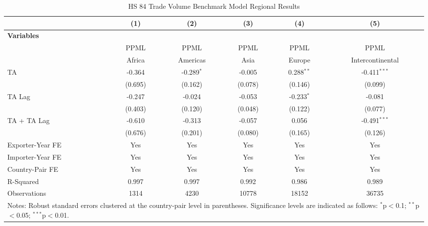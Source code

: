 \begin{table}[htbp]
    \centering
    \caption{HS 84 Trade Volume Benchmark Model Regional Results}
    \label{tab:84_trade_benchmark_region_analysis}
    \begin{adjustbox}{max width=\textwidth}
    \begin{tabular}{l@{\extracolsep{1pt}}ccccc}
    \hline
    & \multicolumn{1}{c}{(1)} & \multicolumn{1}{c}{(2)} & \multicolumn{1}{c}{(3)} & \multicolumn{1}{c}{(4)} & \multicolumn{1}{c}{(5)} \\
    \hline
    \textbf{Variables} &  &  &  &  &  \\
    \hline
     & PPML & PPML & PPML & PPML & PPML \\
     & Africa & Americas & Asia & Europe & Intercontinental \\
    \hline
    TA & -0.364 & -0.289$^{\ast}$ & -0.005 & 0.288$^{\ast\ast}$ & -0.411$^{\ast\ast\ast}$ \\
    & (0.695) & (0.162) & (0.078) & (0.146) & (0.099) \\

    TA Lag & -0.247 & -0.024 & -0.053 & -0.233$^{\ast}$ & -0.081 \\
    & (0.403) & (0.120) & (0.048) & (0.122) & (0.077) \\

    TA + TA Lag & -0.610 & -0.313 & -0.057 & 0.056 & -0.491$^{\ast\ast\ast}$ \\
    & (0.676) & (0.201) & (0.080) & (0.165) & (0.126) \\
    \hline
    Exporter-Year FE & Yes & Yes & Yes & Yes & Yes \\
    Importer-Year FE & Yes & Yes & Yes & Yes & Yes \\
    Country-Pair FE & Yes & Yes & Yes & Yes & Yes \\
    R-Squared & 0.997 & 0.997 & 0.992 & 0.986 & 0.989 \\
    Observations & 1314 & 4230 & 10778 & 18152 & 36735 \\
    \hline
    \multicolumn{6}{l}{\footnotesize{Notes: Robust standard errors clustered at the country-pair level in parentheses. Significance levels are indicated as follows: $^{\ast}$p$<$0.1; $^{\ast\ast}$p$<$0.05; $^{\ast\ast\ast}$p$<$0.01.}} \\
    \end{tabular}
    \end{adjustbox}
\end{table}
